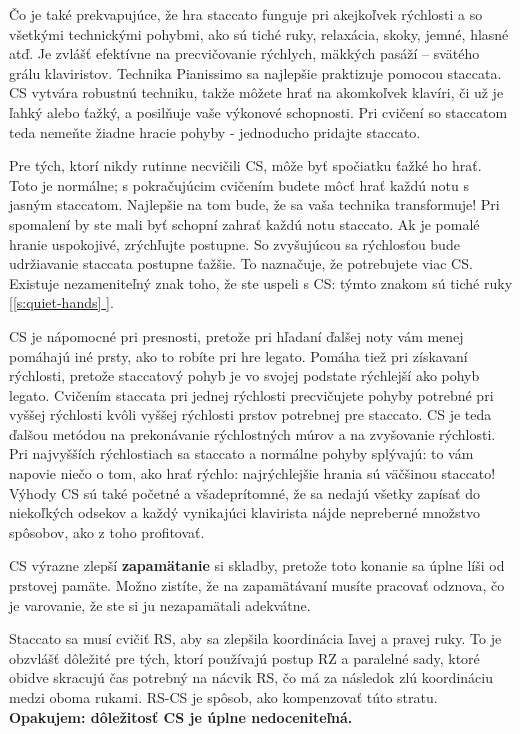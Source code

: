 \documentclass[11pt,a4paper]{book}
\newcommand*{\fullref}[1]{\hyperref[{#1}]{\ref*{#1} \nameref*{#1}}} %
\newcommand*{\fullrefp}[1]{[\fullref{#1}]} %
\begin{document}
Čo je také prekvapujúce, že hra staccato funguje pri akejkoľvek rýchlosti a so všetkými technickými pohybmi, ako sú tiché ruky, relaxácia, skoky, jemné, hlasné atď. Je zvlášť efektívne na precvičovanie rýchlych, mäkkých pasáží – svätého grálu klaviristov. Technika Pianissimo sa najlepšie praktizuje pomocou staccata. CS vytvára robustnú techniku, takže môžete hrať na akomkoľvek klavíri, či už je ľahký alebo ťažký, a posilňuje vaše výkonové schopnosti. Pri cvičení so staccatom teda nemeňte žiadne hracie pohyby - jednoducho pridajte staccato.

Pre tých, ktorí nikdy rutinne necvičili CS, môže byť spočiatku ťažké ho hrať. Toto je normálne; s pokračujúcim cvičením budete môcť hrať každú notu s jasným staccatom. Najlepšie na tom bude, že sa vaša technika transformuje! Pri spomalení by ste mali byť schopní zahrať každú notu staccato. Ak je pomalé hranie uspokojivé, zrýchľujte postupne. So zvyšujúcou sa rýchlosťou bude udržiavanie staccata postupne ťažšie. To naznačuje, že potrebujete viac CS. Existuje nezameniteľný znak toho, že ste uspeli s CS: týmto znakom sú tiché ruky \fullrefp{s:quiet-hands}.

CS je nápomocné pri presnosti, pretože pri hľadaní ďalšej noty vám menej pomáhajú iné prsty, ako to robíte pri hre legato. Pomáha tiež pri získavaní rýchlosti, pretože staccatový pohyb je vo svojej podstate rýchlejší ako pohyb legato. Cvičením staccata pri jednej rýchlosti precvičujete pohyby potrebné pri vyššej rýchlosti kvôli vyššej rýchlosti prstov potrebnej pre staccato. CS je teda ďalšou metódou na prekonávanie rýchlostných múrov a na zvyšovanie rýchlosti. Pri najvyšších rýchlostiach sa staccato a normálne pohyby splývajú: to vám napovie niečo o tom, ako hrať rýchlo: najrýchlejšie hrania sú väčšinou staccato! Výhody CS sú také početné a všadeprítomné, že sa nedajú všetky zapísať do niekoľkých odsekov a každý vynikajúci klavirista nájde nepreberné množstvo spôsobov, ako z toho profitovať.

CS výrazne zlepší \textbf{zapamätanie} si skladby, pretože toto konanie sa úplne líši od prstovej pamäte. Možno zistíte, že na zapamätávaní musíte pracovať odznova, čo je varovanie, že ste si ju nezapamätali adekvátne.

Staccato sa musí cvičiť RS, aby sa zlepšila koordinácia ľavej a pravej ruky. To je obzvlášť dôležité pre tých, ktorí používajú postup RZ a paralelné sady, ktoré obidve skracujú čas potrebný na nácvik RS, čo má za následok zlú koordináciu medzi oboma rukami. RS-CS je spôsob, ako kompenzovať túto stratu. \textbf{Opakujem: dôležitosť CS je úplne nedoceniteľná.}
\end{document}

